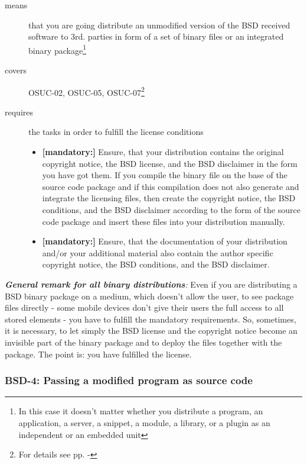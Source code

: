 \begin{description}
\item[means] that you are going distribute an unmodified version of the BSD
received software to 3rd. parties in form of a set of binary files or an
integrated bi\-na\-ry package\footnote{In this case it doesn't matter whether
you distribute a program, an application, a server, a snippet, a module, a library,
or a plugin as an independent or an embedded unit}
\item[covers] OSUC-02, OSUC-05, OSUC-07\footnote{For details see pp.
\pageref{OSUC-02-DEF} - \pageref{OSUC-07-DEF}}
\item[requires] the tasks in order to fulfill the license conditions
\begin{itemize}
  \item  \textbf{[mandatory:]} Ensure, that your distribution contains the
  original copyright notice, the BSD license, and the BSD disclaimer in the form
  you have got them. If you compile the binary file on the base of the source
  code package and if this compilation does not also generate and integrate the
  licensing files, then create the copyright notice, the BSD conditions, and the
  BSD disclaimer according to the form of the source code package and insert
  these files into your distribution manually.
  \item  \textbf{[mandatory:]} Ensure, that the documentation of your
  distribution and/or your additional material also contain the author specific
  copyright notice, the BSD conditions, and the BSD disclaimer.
\end{itemize}
\end{description}

\begin{itshape}
\emph{\textbf{General remark for all binary distributions}:} 
\label{MobileDeviceHint} Even if you are distributing a BSD bi\-na\-ry package
on a medium, which doesn't allow the user, to see package files directly - some
mobile devices don't give their users the full access to all stored elements -
you have to fulfill the mandatory requirements. So, sometimes, it is necessary,
to let simply the BSD license and the copyright notice become an invisible part
of the binary package and to deploy the files together with the package. The
point is: you have fulfilled the license.
\end{itshape}

\subsubsection{BSD-4: Passing a modified program as source code}
\label{OSUC-04-BSD}

